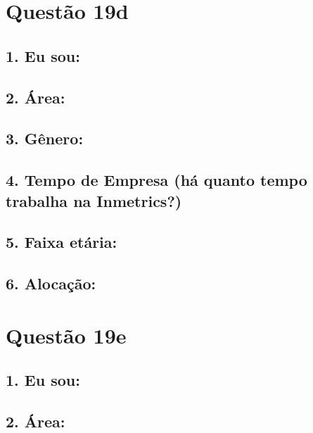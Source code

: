 \documentclass[]{book}
\begin{document}
\hypertarget{questao-19d}{%
\section{Questão 19d}\label{questao-19d}}

\hypertarget{eu-sou-48}{%
\subsection{1. Eu sou:}\label{eu-sou-48}}

\hypertarget{area-48}{%
\subsection{2. Área:}\label{area-48}}

\hypertarget{genero-48}{%
\subsection{3. Gênero:}\label{genero-48}}

\hypertarget{tempo-de-empresa-ha-quanto-tempo-trabalha-na-inmetrics-48}{%
\subsection{4. Tempo de Empresa (há quanto tempo trabalha na Inmetrics?)}\label{tempo-de-empresa-ha-quanto-tempo-trabalha-na-inmetrics-48}}

\hypertarget{faixa-etaria-48}{%
\subsection{5. Faixa etária:}\label{faixa-etaria-48}}

\hypertarget{alocacao-48}{%
\subsection{6. Alocação:}\label{alocacao-48}}

\hypertarget{questao-19e}{%
\section{Questão 19e}\label{questao-19e}}

\hypertarget{eu-sou-49}{%
\subsection{1. Eu sou:}\label{eu-sou-49}}

\hypertarget{area-49}{%
\subsection{2. Área:}\label{area-49}}
\end{document}
